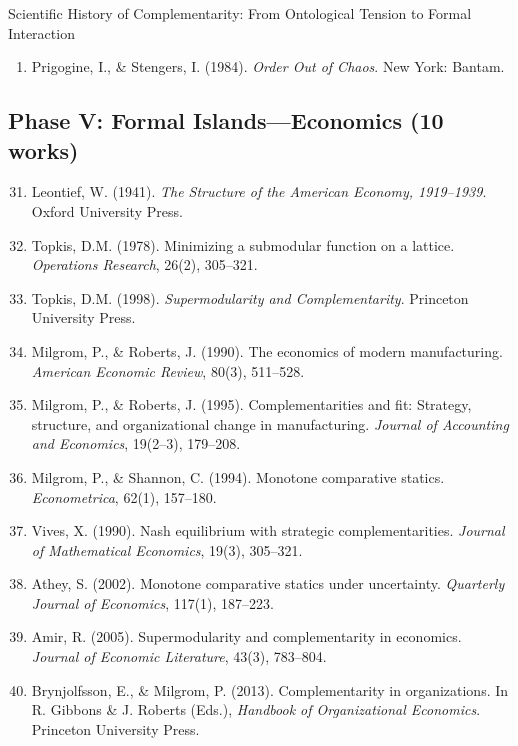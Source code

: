 \begin{chapter}{Scientific History of Complementarity: From Ontological Tension to Formal Interaction}
\begin{enumerate}
    \item Prigogine, I., \& Stengers, I. (1984). \textit{Order Out of Chaos}. New York: Bantam.
\end{enumerate}

\subsection{Phase V: Formal Islands---Economics (10 works)}

\begin{enumerate}
    \setcounter{enumi}{30}
    \item Leontief, W. (1941). \textit{The Structure of the American Economy, 1919--1939}. Oxford University Press.

    \item Topkis, D.M. (1978). Minimizing a submodular function on a lattice. \textit{Operations Research}, 26(2), 305--321.

    \item Topkis, D.M. (1998). \textit{Supermodularity and Complementarity}. Princeton University Press.

    \item Milgrom, P., \& Roberts, J. (1990). The economics of modern manufacturing. \textit{American Economic Review}, 80(3), 511--528.

    \item Milgrom, P., \& Roberts, J. (1995). Complementarities and fit: Strategy, structure, and organizational change in manufacturing. \textit{Journal of Accounting and Economics}, 19(2--3), 179--208.

    \item Milgrom, P., \& Shannon, C. (1994). Monotone comparative statics. \textit{Econometrica}, 62(1), 157--180.

    \item Vives, X. (1990). Nash equilibrium with strategic complementarities. \textit{Journal of Mathematical Economics}, 19(3), 305--321.

    \item Athey, S. (2002). Monotone comparative statics under uncertainty. \textit{Quarterly Journal of Economics}, 117(1), 187--223.

    \item Amir, R. (2005). Supermodularity and complementarity in economics. \textit{Journal of Economic Literature}, 43(3), 783--804.

    \item Brynjolfsson, E., \& Milgrom, P. (2013). Complementarity in organizations. In R. Gibbons \& J. Roberts (Eds.), \textit{Handbook of Organizational Economics}. Princeton University Press.
\end{enumerate}


\end{chapter}
